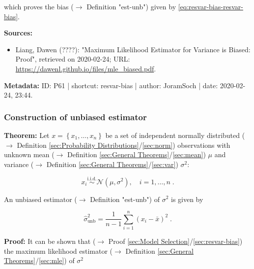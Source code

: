 \documentclass[a4paper,12pt,twoside]{book}
\begin{document}
which proves the bias ($\rightarrow$ Definition "est-unb") given by \eqref{eq:resvar-bias-resvar-bias}.



\vspace{1em}
\textbf{Sources:}
\begin{itemize}
\item Liang, Dawen (????): "Maximum Likelihood Estimator for Variance is Biased: Proof", retrieved on 2020-02-24; URL: \url{https://dawenl.github.io/files/mle_biased.pdf}.
\end{itemize}


\vspace{1em}
\textbf{Metadata:} ID: P61 | shortcut: resvar-bias | author: JoramSoch | date: 2020-02-24, 23:44.
\vspace{1em}



\subsubsection[\textbf{Construction of unbiased estimator}]{Construction of unbiased estimator} \label{sec:resvar-unb}
\setcounter{equation}{0}

\textbf{Theorem:} Let $x = \left\lbrace x_1, \ldots, x_n \right\rbrace$ be a set of independent normally distributed ($\rightarrow$ Definition \ref{sec:Probability Distributions}/\ref{sec:norm}) observations with unknown mean ($\rightarrow$ Definition \ref{sec:General Theorems}/\ref{sec:mean}) $\mu$ and variance ($\rightarrow$ Definition \ref{sec:General Theorems}/\ref{sec:var}) $\sigma^2$:

\begin{equation} \label{eq:resvar-unb-ug}
x_i \overset{\text{i.i.d.}}{\sim} \mathcal{N}(\mu, \sigma^2), \quad i = 1,\ldots,n \; .
\end{equation}

An unbiased estimator ($\rightarrow$ Definition "est-unb") of $\sigma^2$ is given by

\begin{equation} \label{eq:resvar-unb-resvar-unb}
\hat{\sigma}^2_{\mathrm{unb}} = \frac{1}{n-1} \sum_{i=1}^{n} \left( x_i - \bar{x} \right)^2 \; .
\end{equation}


\vspace{1em}
\textbf{Proof:} It can be shown that ($\rightarrow$ Proof \ref{sec:Model Selection}/\ref{sec:resvar-bias}) the maximum likelihood estimator ($\rightarrow$ Definition \ref{sec:General Theorems}/\ref{sec:mle}) of $\sigma^2$
\end{document}
